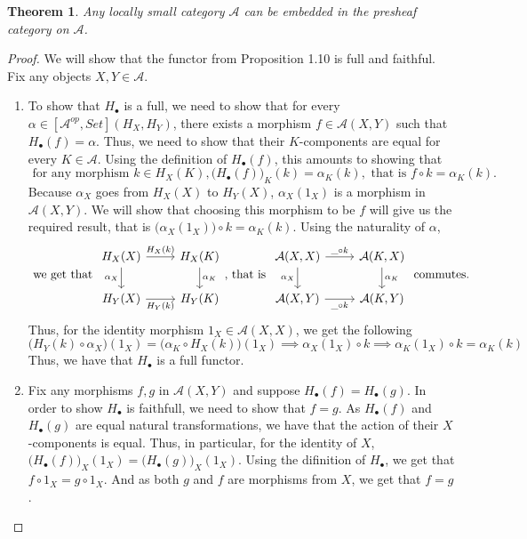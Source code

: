 \documentclass[18pt,a4paper]{article}
\newtheorem{theorem}{Theorem}[section]
\theoremstyle{definition}
\begin{document}
\begin{theorem}
	Any locally small category $\mathcal{A}$ can be embedded in the presheaf category on
	$\mathcal{A}$.
\end{theorem}
\begin{proof} \setcounter{equation}{0}
	We will show that the functor from Proposition 1.10 is
	full and faithful. Fix any objects $X,Y \in \mathcal{A}$.
	\begin{enumerate}[label=\Roman*]
		\item To show that $H_\bullet$ is a full, we need to show that for every $\alpha
			\in [\mathcal{A} ^{op},Set](H_X,H_Y)$, there exists a morphism
			$f\in \mathcal{A} (X,Y)$ such that $H_\bullet(f)=\alpha$. Thus, we need
			to show that their $K$-components are equal for every $K \in \mathcal{A}$.
			Using the definition of $H_\bullet(f)$, this amounts to showing that
			\begin{equation}  \text{ for any morphism } k \in H_X(K),
				\Big(H_\bullet(f)\Big)_K^{}(k)=\alpha_K(k), \text{ that is }
				f\circ k=\alpha_K(k).
		\end{equation}
		Because $\alpha_X$ goes from $H_X(X)$ to $H_Y(X)$, $\alpha_X(1_X)$ is a morphism
		in $\mathcal{A}(X,Y)$. We will show that choosing this morphism to be $f$
		will give us the required result, that is $\big( \alpha_X(1_X) \big) \circ
		k=\alpha_K(k)$. Using the naturality of $\alpha$,
		\[ \text{ we get that }
		\begin{tikzcd}
		H_X(X) \arrow[swap]{d}{\alpha_X} \arrow{r}{H_X(k)}
			& H_X(K) \arrow{d}{\alpha_K}\\
		H_Y(X) \arrow[swap]{r}{H_Y(k)}
			& H_Y(K)
		\end{tikzcd}
		\text{, that is }
		\begin{tikzcd}
			\mathcal{A} (X,X) \arrow[swap]{d}{\alpha_X} \arrow{r}{\string _ \circ k}
			& \mathcal{A} (K,X) \arrow{d}{\alpha_K}\\
			\mathcal{A} (X,Y) \arrow[swap]{r}{\string _ \circ k}
			& \mathcal{A} (K,Y)
		\end{tikzcd}
		\text{ commutes. }\]
		Thus, for the identity morphism $1_X \in \mathcal{A} (X,X)$, we get the following
		\[ \Big(H_Y(k) \circ \alpha_X\Big)(1_X)=\Big(\alpha_K \circ H_X(k)\Big)(1_X)
			\implies  \alpha_X(1_X) \circ k \implies
		\alpha_K(1_X) \circ k=\alpha_K(k)\]
		Thus, we have that $H_\bullet$ is a full functor.

	\item  Fix any morphisms $f,g$ in $\mathcal{A} (X,Y)$ and suppose
		$H_\bullet(f)=H_\bullet(g)$. In order to show $H_\bullet$ is faithfull,
		we need to show that $f=g$. As $H_\bullet(f)$ and $H_\bullet(g)$ are equal natural
		transformations, we have that the action of their $X$-components is equal. Thus,
		in particular, for the identity of $X$, $\big(H_\bullet(f) \big)_X (1_X)
		= \big(H_\bullet(g) \big)_X (1_X)$. Using the difinition of $H_\bullet$, we get
		that $f \circ 1_X = g \circ 1_X$. And as both $g$ and $f$ are morphisms
		from $X$, we get that $f=g$.
	\end{enumerate}
\end{proof}
\end{document}
